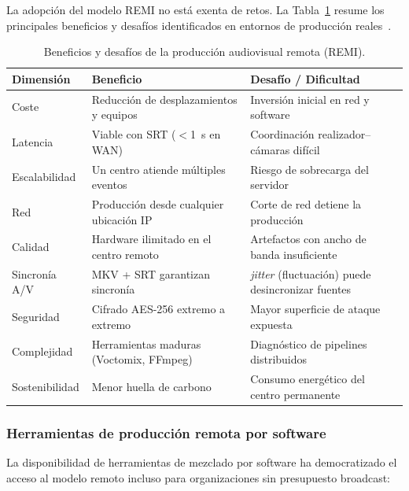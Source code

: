 La adopción del modelo REMI no está exenta de retos. La Tabla~\ref{tab:remi_beneficios_desafios}
resume los principales beneficios y desafíos identificados en entornos de producción
reales~\cite{tmbroadcast_remi,remi_workflow_ibc2023}.

\begin{table}[H]
  \centering
  \caption{Beneficios y desafíos de la producción audiovisual remota (REMI).}
  \label{tab:remi_beneficios_desafios}
  \small
  \begin{tabularx}{\linewidth}{|p{2.2cm}|X|X|}
    \hline
    \textbf{Dimensión} & \textbf{Beneficio} & \textbf{Desafío / Dificultad} \\
    \hline
    Coste           & Reducción de desplazamientos y equipos    & Inversión inicial en red y software \\
    Latencia        & Viable con SRT ($<$1~s en WAN)            & Coordinación realizador--cámaras difícil \\
    Escalabilidad   & Un centro atiende múltiples eventos       & Riesgo de sobrecarga del servidor \\
    Red             & Producción desde cualquier ubicación IP   & Corte de red detiene la producción \\
    Calidad         & Hardware ilimitado en el centro remoto    & Artefactos con ancho de banda insuficiente \\
    Sincronía A/V   & MKV + SRT garantizan sincronía            & \textit{jitter} (fluctuación) puede desincronizar fuentes \\
    Seguridad       & Cifrado AES-256 extremo a extremo         & Mayor superficie de ataque expuesta \\
    Complejidad     & Herramientas maduras (Voctomix, FFmpeg)   & Diagnóstico de pipelines distribuidos \\
    Sostenibilidad  & Menor huella de carbono                   & Consumo energético del centro permanente \\
    \hline
  \end{tabularx}
\end{table}


\subsubsection*{Herramientas de producción remota por software}

La disponibilidad de herramientas de mezclado por software ha democratizado el acceso
al modelo remoto incluso para organizaciones sin presupuesto broadcast:

